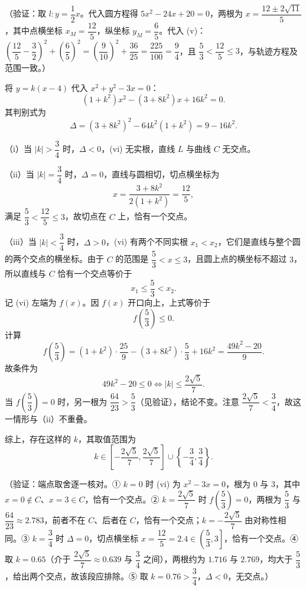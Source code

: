 \begin{answer}
（验证：取 \(l:y=\dfrac12x\)。代入圆方程得 \(5x^2-24x+20=0\)，两根为 \(x=\dfrac{12\pm2\sqrt{11}}{5}\)，其中点横坐标 \(x_M=\dfrac{12}{5}\)，纵坐标 \(y_M=\dfrac65\)。代入 (v)：\(\left(\dfrac{12}{5}-\dfrac32\right)^2+\left(\dfrac65\right)^2=\left(\dfrac9{10}\right)^2+\dfrac{36}{25}=\dfrac{225}{100}=\dfrac94\)，且 \(\dfrac53<\dfrac{12}{5}\leqslant3\)，与轨迹方程及范围一致。）


将 \(y=k(x-4)\) 代入 \(x^2+y^2-3x=0\)：
\nopagebreak[4]
\[
(1+k^2)x^2-(3+8k^2)x+16k^2=0. \tag*{(vi)}
\]
其判别式为
\nopagebreak[4]
\[
\Delta=(3+8k^2)^2-64k^2(1+k^2)=9-16k^2.
\]

（i）当 \(|k|>\dfrac34\) 时，\(\Delta<0\)，(vi) 无实根，直线 \(L\) 与曲线 \(C\) 无交点。

（ii）当 \(|k|=\dfrac34\) 时，\(\Delta=0\)，直线与圆相切，切点横坐标为
\nopagebreak[4]
\[
x=\dfrac{3+8k^2}{2(1+k^2)}=\dfrac{12}{5},
\]
满足 \(\dfrac53<\dfrac{12}{5}\leqslant3\)，故切点在 \(C\) 上，恰有一个交点。

（iii）当 \(|k|<\dfrac34\) 时，\(\Delta>0\)，(vi) 有两个不同实根 \(x_1<x_2\)，它们是直线与整个圆的两个交点的横坐标。由于 \(C\) 的范围是 \(\dfrac53<x\leqslant3\)，且圆上点的横坐标不超过 \(3\)，所以直线与 \(C\) 恰有一个交点等价于
\nopagebreak[4]
\[
x_1\leqslant\dfrac53<x_2.
\]
记 (vi) 左端为 \(f(x)\)。因 \(f(x)\) 开口向上，上式等价于
\nopagebreak[4]
\[
f\left(\dfrac53\right)\leqslant0.
\]
计算
\nopagebreak[4]
\[
f\left(\dfrac53\right)=(1+k^2)\cdot\dfrac{25}{9}-(3+8k^2)\cdot\dfrac53+16k^2=\dfrac{49k^2-20}{9}.
\]
故条件为
\nopagebreak[4]
\[
49k^2-20\leqslant0\iff |k|\leqslant\dfrac{2\sqrt5}{7}.
\]
当 \(f\left(\dfrac53\right)=0\) 时，另一根为 \(\dfrac{64}{23}>\dfrac53\)（见验证），结论不变。注意 \(\dfrac{2\sqrt5}{7}<\dfrac34\)，故这一情形与（ii）不重叠。

综上，存在这样的 \(k\)，其取值范围为
\nopagebreak[4]
\[
k\in\left[-\dfrac{2\sqrt5}{7},\dfrac{2\sqrt5}{7}\right]\cup\left\{-\dfrac34,\dfrac34\right\}.
\]

（验证：端点取舍逐一核对。① \(k=0\) 时 (vi) 为 \(x^2-3x=0\)，根为 \(0\) 与 \(3\)，其中 \(x=0\notin C\)、\(x=3\in C\)，恰有一个交点。② \(k=\dfrac{2\sqrt5}{7}\) 时 \(f\left(\dfrac53\right)=0\)，两根为 \(\dfrac53\) 与 \(\dfrac{64}{23}\approx2.783\)，前者不在 \(C\)、后者在 \(C\)，恰有一个交点；\(k=-\dfrac{2\sqrt5}{7}\) 由对称性相同。③ \(k=\dfrac34\) 时 \(\Delta=0\)，切点横坐标 \(x=\dfrac{12}{5}=2.4\in\left(\dfrac53,3\right]\)，恰有一个交点。④ 取 \(k=0.65\)（介于 \(\dfrac{2\sqrt5}{7}\approx0.639\) 与 \(\dfrac34\) 之间），两根约为 \(1.716\) 与 \(2.769\)，均大于 \(\dfrac53\)，给出两个交点，故该段应排除。⑤ 取 \(k=0.76>\dfrac34\)，\(\Delta<0\)，无交点。）


\end{answer}
